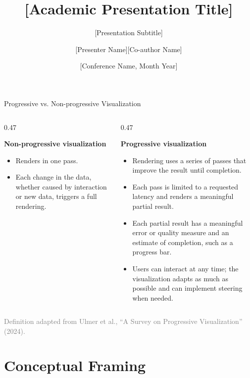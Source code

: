 \documentclass[aspectratio=169]{beamer}
\title[Research Talk]{[Academic Presentation Title]}
\subtitle{[Presentation Subtitle]}
\author[Presenter, Co-author]{[Presenter Name]\inst{1}\hspace{1em}[Co-author Name]\inst{2}}
\institute[Institution]{%
  \inst{1}[Department / Institution]\\
  \inst{2}[Department / Institution]
}
\date[Conference, Month Year]{[Conference Name, Month Year]}
\begin{document}
\begin{frame}
  \titlepage
\end{frame}

\begin{frame}{Progressive vs. Non-progressive Visualization}
  \begin{columns}[T,onlytextwidth]
    \begin{column}{0.47\textwidth}
      {\large\bfseries\color{ConferenceBlue}Non-progressive visualization\par}
      \vspace{0.55em}
      \small
      \begin{itemize}
        \setlength{\itemsep}{0.8em}
        \item Renders in one pass.
        \item Each change in the data, whether caused by interaction or new data, triggers a full rendering.
      \end{itemize}
    \end{column}
    \begin{column}{0.47\textwidth}
      {\large\bfseries\color{ConferenceBlue}Progressive visualization\par}
      \vspace{0.55em}
      \small
      \begin{itemize}
        \setlength{\itemsep}{0.65em}
        \item Rendering uses a series of passes that improve the result until completion.
        \item Each pass is limited to a requested latency and renders a meaningful partial result.
        \item Each partial result has a meaningful error or quality measure and an estimate of completion, such as a progress bar.
        \item Users can interact at any time; the visualization adapts as much as possible and can implement steering when needed.
      \end{itemize}
    \end{column}
  \end{columns}
  \vfill
  \centering
  {\scriptsize\textcolor{gray}{Definition adapted from Ulmer et al., ``A Survey on Progressive Visualization'' (2024).}}
\end{frame}

\section{Conceptual Framing}
\end{document}
